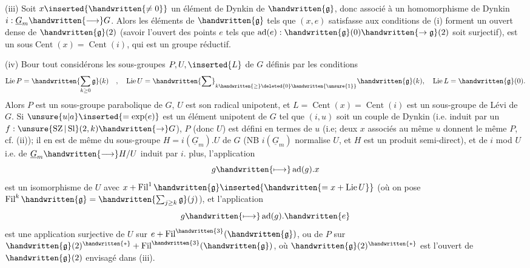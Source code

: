 (iii) Soit $x\inserted{\handwritten{\ne0}}$ un élément de Dynkin de $\handwritten{\mathfrak{g}}$, donc associé à un homomorphisme de Dynkin $i:\underline{G}_m\handwritten{\longrightarrow}G$. Alors les éléments de $\handwritten{\mathfrak{g}}$ tels que $(x,e)$ satisfasse aux conditions de (i) forment un ouvert dense de $\handwritten{\mathfrak{g}}(2)$ (savoir l'ouvert des points $e$ tels que $\operatorname{ad}(e):\handwritten{\mathfrak{g}}(0)\handwritten{\to\mathfrak{g}}(2)$ soit surjectif),  est un  sous$\operatorname{Cent}(x)=\operatorname{Cent}(i)$, qui est un groupe réductif.

(iv) Bour tout  considérons les sous-groupes $P,U,\inserted{L}$ de $G$ définis par les conditions
\[
\operatorname{Lie}P=\handwritten{\sum_{k\geq0}\mathfrak{g}}(k)\quad,\quad
\operatorname{Lie}U=\handwritten{\sum}_{k\handwritten{\geq}\deleted{0}\handwritten{\unsure{1}}}\handwritten{\mathfrak{g}}(k),\quad
\operatorname{Lie}L=\handwritten{\mathfrak{g}}(0).
\]
Alors $P$ est un sous-groupe parabolique de $G$, $U$ est son radical unipotent, et $L=\operatorname{Cent}(x)=\operatorname{Cent}(i)$  est un sous-groupe de Lévi de $G$. Si $\unsure{u|a}\inserted{=\exp(e)}$ est un élément unipotent de $G$ tel que $(i,u)$ soit un couple de Dynkin (i.e. induit par un $f:\unsure{\operatorname{SZ}|\operatorname{Sl}}(2,k)\handwritten{\to}G$), $P$ (donc  $U$) est défini en termes de $u$ (i.e; deux $x$ associés au même $u$ donnent le même $P$, cf. (ii)); il en est de même du sous-groupe $H=i(\underline{G}_m).U$ de $G$ (NB $i(\underline{G}_m)$ normalise $U$, et $H$ est un produit semi-direct), et de $i$ mod $U$ i.e. de $\underline{G}_m\handwritten{\longrightarrow}H/U$ induit par $i$.  plus, l'application
\[
g\handwritten{\longmapsto}\operatorname{ad}(g).x
\]
est un isomorphisme de $U$ avec $x+\operatorname{Fil}^{1}\handwritten{\mathfrak{g}}\inserted{\handwritten{=x+\operatorname{Lie}U}}$ (où on pose $\operatorname{Fil}^{k}\handwritten{\mathfrak{g}}=\handwritten{\sum_{j\geq k}\mathfrak{g}}(j)$), et l'application
\[
g\handwritten{\longmapsto}\operatorname{ad}(g).\handwritten{e}
\]
est une application surjective de $U$ sur $e+\operatorname{Fil}^{\handwritten{3}}(\handwritten{\mathfrak{g}})$, ou de $P$ sur $\handwritten{\mathfrak{g}}(2)^{\handwritten{*}}+\operatorname{Fil}^{\handwritten{3}}(\handwritten{\mathfrak{g}})$, où $\handwritten{\mathfrak{g}}(2)^{\handwritten{*}}$ est l'ouvert de $\handwritten{\mathfrak{g}}(2)$ envisagé dans (iii).

